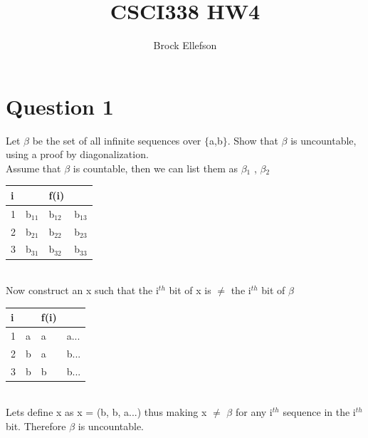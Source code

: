 \documentclass[10pt,a4paper]{article}
\author{Brock Ellefson}
\title{CSCI338 HW4}
\begin{document}
\maketitle
\section*{Question 1}
Let $\beta$ be the set of all infinite sequences over $\lbrace$a,b$\rbrace$. Show that $\beta$ is uncountable,
using a proof by diagonalization.\\
Assume that $\beta$ is countable, then we can list them as $\beta$$_{1}$ , $\beta$$_{2}$
\begin{table}[h]
\centering
\begin{tabular}{l|lll}
i & {\ul } & f(i) &     \\ \hline
1 & b$_{11}$    & b$_{12}$  & b$_{13}$ \\
2 & b$_{21}$    & b$_{22}$  & b$_{23}$ \\
3 & b$_{31}$    & b$_{32}$  & b$_{33}$
\end{tabular}
\end{table}
\\Now construct an x such that the i$^{th}$ bit of x is $\neq$ the i$^{th}$ bit of $\beta$
\begin{table}[h]
\centering
\begin{tabular}{l|lll}
i & {\ul } & f(i) &   \\ \hline
1 & a      & a & a... \\
2 & b      & a & b... \\
3 & b      & b & b...
\end{tabular}
\end{table}
\\Lets define x as x = (b, b, a...) thus making x $\neq$ $\beta$ for any i$^{th}$ sequence in the i$^{th}$ bit. Therefore $\beta$ is uncountable.
\end{document}
